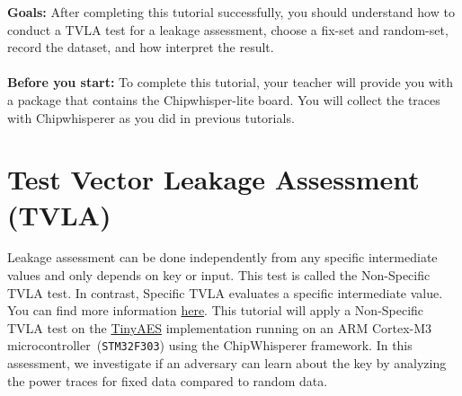 \documentclass[11pt]{article}
\author{Tutorial 4: Leakage assessment}
\date{Omid Bazangani (omid.bazangani@ru.nl)} %
\begin{document}
\maketitle
\noindent \textbf{Goals:} After completing this tutorial successfully, you should understand how to conduct a TVLA test for a leakage assessment, choose a fix-set and random-set, record the dataset, and how interpret the result.   \\\\

\noindent \textbf{Before you start:} To complete this tutorial, your teacher will provide you with a package that contains the Chipwhisper-lite board. You will collect the traces with Chipwhisperer as you did in previous tutorials.


\section{Test Vector Leakage Assessment (TVLA)}
Leakage assessment can be done independently from any specific intermediate values and only depends on key or input. This test is called the Non-Specific TVLA test. In contrast, Specific TVLA evaluates a specific intermediate value. You can find more information \href{https://www.rambus.com/wp-content/uploads/2015/08/TVLA-DTR-with-AES.pdf} {here}.
This tutorial will apply a Non-Specific TVLA test on the \href{https://github.com/kokke/tiny-AES-c}{TinyAES} implementation running on an ARM Cortex-M3 microcontroller~(\texttt{STM32F303}) using the ChipWhisperer framework. In this assessment, we investigate if an adversary can learn about the key by analyzing the power traces for fixed data compared to random data. 
\end{document}
